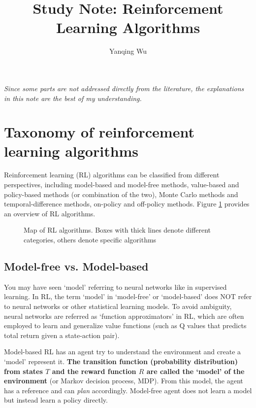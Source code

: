 \documentclass[lang=en,mode=normal,device=normal,color=blue,12pt]{elegantnote}
\title{Study Note: Reinforcement Learning Algorithms}
\author{Yanqing Wu\\[0.5cm]{}}
\institute{}
\DeclareMathOperator*{\1}{\mathbbm{1}}
\begin{document}
\maketitle

\newpage
\tableofcontents

\newpage

\textit{Since some parts are not addressed directly from the literature, the explanations in this note are the best of my understanding.}

\newpage
\section{Taxonomy of reinforcement learning algorithms}

Reinforcement learning (RL) algorithms can be classified from different perspectives, including model-based and model-free methods, value-based and policy-based methods (or combination of the two), Monte Carlo methods and temporal-difference methods, on-policy and off-policy methods. Figure \ref{fig:taxonomy} provides an overview of RL algorithms.

\begin{figure}[!ht]
  \centering
  \caption{Map of RL algorithms. Boxes with thick lines denote different categories, others denote specific algorithms \cite{Zhang2020}}
  \label{fig:taxonomy}
\end{figure}

\subsection{Model-free vs. Model-based}
\label{appendix:model-dep}

You may have seen `model' referring to neural networks like in supervised learning.
In RL, the term `model' in `model-free' or `model-based' does NOT refer to neural networks or other statistical learning models.
To avoid ambiguity, neural networks are referred as `function approximators' in RL, which are often employed to learn and generalize value functions (such as Q values that predicts total return given a state-action pair).

Model-based RL has an agent try to understand the environment and create a `model' represent it.
\textbf{The transition function (probability distribution) from states $T$ and the reward function $R$ are called the `model' of the environment} (or Markov decision process, MDP).
From this model, the agent has a reference and can \textit{plan} accordingly. Model-free agent does not learn a model but instead learn a policy directly.
\end{document}
